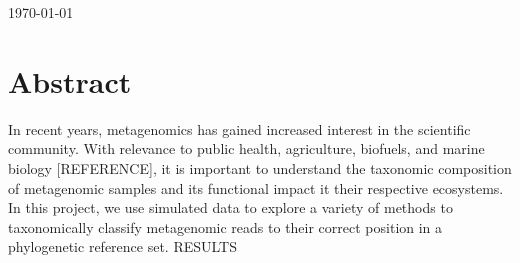 \documentclass[12pt]{article} %
\begin{document}
\begin{titlepage}


{\large \today}\\[3cm] %


 

\vfill %
 \end{titlepage}
\vspace{5 ex}
\section{Abstract}
In recent years, metagenomics has gained increased interest in the scientific community. With relevance to  public health, agriculture, biofuels, and marine biology [REFERENCE], it is important to understand the taxonomic composition of metagenomic samples and its functional impact it their respective ecosystems. In this project, we use simulated data to explore a variety of methods to taxonomically classify metagenomic reads to their correct position in a phylogenetic reference set. RESULTS
\end{document}
